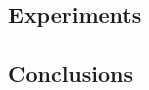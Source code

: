 \documentclass[conference]{IEEEtran}
\begin{document}
\subsection{Experiments}
\label{sec:experiments}

\subsection{Conclusions}
\label{sec:conclusions}



%
%



%
%
\end{document}
